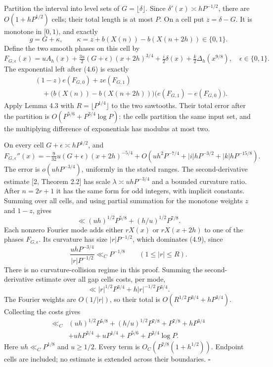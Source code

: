 \documentclass[11pt,a4paper]{article}
\begin{document}
Partition the interval into level sets of \(G=\lfloor\delta\rfloor\).
Since \(\delta'(x)\asymp hP^{-1/2}\), there are \(O(1+hP^{1/2})\) cells;
their total length is at most \(P\). On a cell put \(z=\delta-G\). It is
monotone in \([0,1)\), and exactly \[
g=G+\kappa,\qquad
\kappa=z+b(X(n))-b(X(n+2h))\in\{0,1\}.
\tag{4.7}
\] Define the two smooth phases on this cell by \[
F_{G,\epsilon}(x)=uA_h(x)+\tfrac{3u}{2}(G+\epsilon)(x+2h)^{3/4}
+\tfrac i2\delta(x)+\tfrac k2\Delta_h(x^{9/8}),
\quad\epsilon\in\{0,1\}.
\] The exponential left after (4.6) is exactly \[
\begin{split}
&(1-z)e(F_{G,0})+z e(F_{G,1})\\
&\quad+\bigl(b(X(n))-b(X(n+2h))\bigr)
\bigl(e(F_{G,1})-e(F_{G,0})\bigr).
\end{split}
\tag{4.8}
\] Apply Lemma 4.3 with \(R=\lfloor P^{1/4}\rfloor\) to the two
sawtooths. Their total error after the partition is
\(O(P^{5/6}+P^{3/4}\log P)\): the cells partition the same input set,
and the multiplying difference of exponentials has modulus at most two.

On every cell \(G+\epsilon\asymp hP^{1/2}\), and \[
F_{G,\epsilon}''(x)
=-\tfrac9{32}u(G+\epsilon)(x+2h)^{-5/4}
+O(uh^2P^{-7/4}+|i|hP^{-3/2}+|k|hP^{-15/8}).
\tag{4.9}
\] The error is \(o(uhP^{-3/4})\), uniformly in the stated ranges. The
second-derivative estimate {[}2, Theorem 2.2{]} has scale
\(\lambda\asymp uhP^{-3/4}\) and a bounded curvature ratio. After
\(n=2r+1\) it has the same form for odd integers, with implicit
constants. Summing over all cells, and using partial summation for the
monotone weights \(z\) and \(1-z\), gives \[
\ll (uh)^{1/2}P^{5/8}+(h/u)^{1/2}P^{7/8}.
\tag{4.10}
\] Each nonzero Fourier mode adds either \(rX(x)\) or \(rX(x+2h)\) to
one of the phases \(F_{G,\epsilon}\). Its curvature has size
\(|r|P^{-1/2}\), which dominates (4.9), since \[
\frac{uhP^{-3/4}}{|r|P^{-1/2}}\ll_C P^{-1/8}
\qquad(1\le |r|\le R).
\] There is no curvature-collision regime in this proof. Summing the
second-derivative estimate over all gap cells costs, per mode, \[
\ll |r|^{1/2}P^{3/4}+h|r|^{-1/2}P^{3/4}.
\] The Fourier weights are \(O(1/|r|)\), so their total is
\(O(R^{1/2}P^{3/4}+hP^{3/4})\). Collecting the costs gives \[
\begin{split}
\ll_C {}&(uh)^{1/2}P^{5/8}+(h/u)^{1/2}P^{7/8}
+P^{7/8}+hP^{3/4}\\
&+uhP^{3/4}+uP^{1/4}+P^{5/6}+P^{3/4}\log P.
\end{split}
\] Here \(uh\ll_C P^{1/8}\) and \(u\ge1/2\). Every term is
\(O_C(P^{7/8}(1+h^{1/2}))\). Endpoint cells are included; no estimate is
extended across their boundaries. \(\square\)
\end{document}
